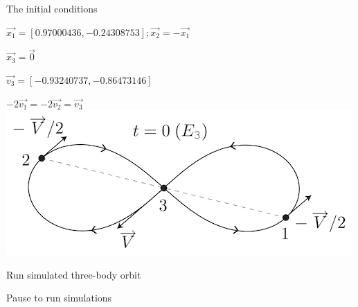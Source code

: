 \documentclass[bigger]{beamer}
\begin{document}
\begin{frame}[label=sec-42]{The initial conditions}
\begin{block}{$\vec{x_1} = [0.97000436, -0.24308753]; \vec{x_2} = -\vec{x_1}$}
\end{block}
\begin{block}{$\vec{x_3} = \vec{0}$}
\end{block}
\begin{block}{$\vec{v_3} = [-0.93240737, -0.86473146]$}
\end{block}
\begin{block}{$-2\vec{v_1} = -2\vec{v_2} = \vec{v_3}$}
\includegraphics[width=.9\linewidth]{figure8.png}
\end{block}
\end{frame}
\begin{frame}[label=sec-43]{Run simulated three-body orbit}
\begin{block}{Pause to run simulations}
\end{block}
\end{frame}
\end{document}
